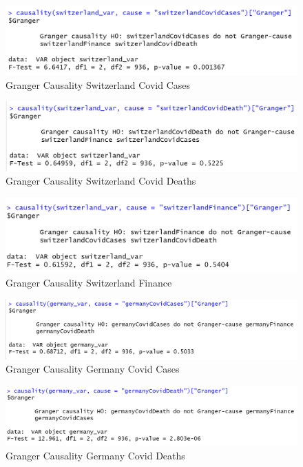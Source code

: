 \documentclass[11pt]{article}
\begin{document}
\begin{figure}[!h]
\centering
  \includegraphics[width=\textwidth]{R-Code/Causalities/Swiss_CC.png}  
  \caption{Granger Causality Switzerland Covid Cases}
  \end{figure}
\begin{figure}[!h]
\centering
  \includegraphics[width=\textwidth]{R-Code/Causalities/Swiss_CD.png}  
  \caption{Granger Causality Switzerland Covid Deaths}
  \end{figure}
 
\begin{figure}[!h]
\centering
  \includegraphics[width=\textwidth]{R-Code/Causalities/Swiss_Financial.png}  
  \caption{Granger Causality Switzerland Finance}
  \end{figure}
  

\begin{figure}[!h]
\centering
  \includegraphics[width=\textwidth]{R-Code/Causalities/Germany_CC.png}  
  \caption{Granger Causality Germany Covid Cases}
  \end{figure}
\begin{figure}[!h]
\centering
  \includegraphics[width=\textwidth]{R-Code/Causalities/Germany_CD.png}  
  \caption{Granger Causality Germany Covid Deaths}
  \end{figure}
 
\end{document}
